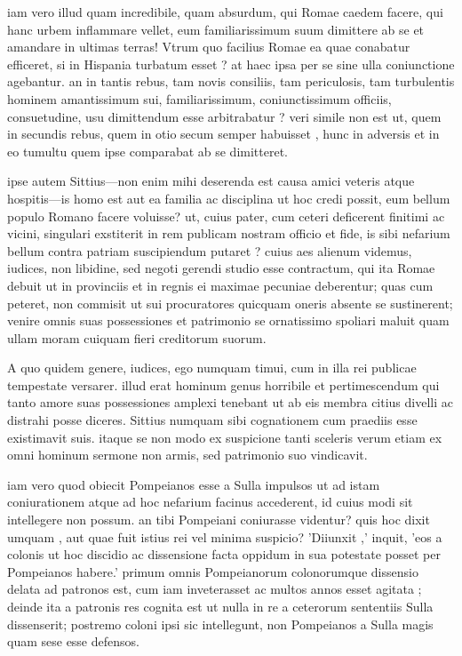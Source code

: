  iam vero illud quam incredibile, quam absurdum, qui Romae caedem facere, qui hanc urbem inflammare vellet, eum familiarissimum suum dimittere ab se et amandare in ultimas terras! Vtrum quo facilius Romae ea quae conabatur efficeret, si in Hispania turbatum esset ? at haec ipsa per se sine ulla coniunctione agebantur. an in tantis rebus, tam novis consiliis, tam periculosis, tam turbulentis hominem amantissimum sui, familiarissimum, coniunctissimum officiis, consuetudine, usu dimittendum esse arbitrabatur ? veri simile non est ut, quem in secundis rebus, quem in otio secum semper habuisset , hunc in adversis et in eo tumultu quem ipse comparabat ab se dimitteret.

 ipse autem Sittius—non enim mihi deserenda est causa amici veteris atque hospitis—is homo est aut ea familia ac disciplina ut hoc credi possit, eum bellum populo Romano facere voluisse? ut, cuius pater, cum ceteri deficerent finitimi ac vicini, singulari exstiterit in rem publicam nostram officio et fide, is sibi nefarium bellum contra patriam suscipiendum putaret ? cuius aes alienum videmus, iudices, non libidine, sed negoti gerendi studio esse contractum, qui ita Romae debuit ut in provinciis et in regnis ei maximae pecuniae deberentur; quas cum peteret, non commisit ut sui procuratores quicquam oneris absente se sustinerent; venire omnis suas possessiones et patrimonio se ornatissimo spoliari maluit quam ullam moram cuiquam fieri creditorum suorum.

 A quo quidem genere, iudices, ego numquam timui, cum in illa rei publicae tempestate versarer. illud erat hominum genus horribile et pertimescendum qui tanto amore suas possessiones amplexi tenebant ut ab eis membra citius divelli ac distrahi posse diceres. Sittius numquam sibi cognationem cum praediis esse existimavit suis. itaque se non modo ex suspicione tanti sceleris verum etiam ex omni hominum sermone non armis, sed patrimonio suo vindicavit.

 iam vero quod obiecit Pompeianos esse a Sulla impulsos ut ad istam coniurationem atque ad hoc nefarium facinus accederent, id cuius modi sit intellegere non possum. an tibi Pompeiani coniurasse videntur? quis hoc dixit umquam , aut quae fuit istius rei vel minima suspicio? 'Diiunxit ,' inquit, 'eos a colonis ut hoc discidio ac dissensione facta oppidum in sua potestate posset per Pompeianos habere.' primum omnis Pompeianorum colonorumque dissensio delata ad patronos est, cum iam inveterasset ac multos annos esset agitata ; deinde ita a patronis res cognita est ut nulla in re a ceterorum sententiis Sulla dissenserit; postremo coloni ipsi sic intellegunt, non Pompeianos a Sulla magis quam sese esse defensos.

